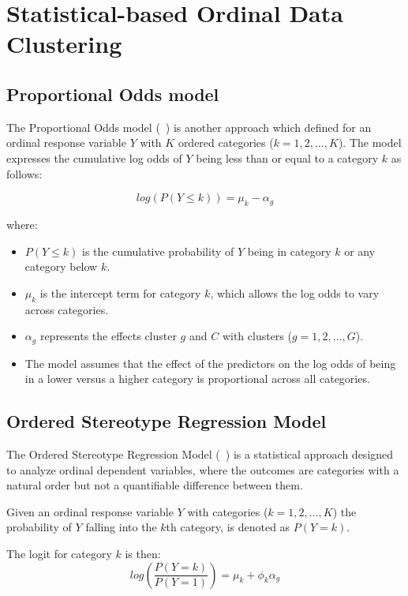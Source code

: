 \documentclass{article}
\begin{document}
\section{Statistical-based Ordinal Data Clustering}

\subsection{Proportional Odds model}

The Proportional Odds model (~\cite{mccullagh1980regression}) is another approach which defined for an ordinal response variable $Y$ with $K$ ordered categories ($k=1, 2, \ldots, K$). 
The model expresses the cumulative log odds of $Y$ being less than or equal to a category $k$ as follows:

\begin{equation}
log(P(Y \leq k )) = \mu_k - \alpha_g
\end{equation}

where:
\begin{itemize}
    \item $P(Y \leq k)$ is the cumulative probability of $Y$ being in category $k$ or any category below $k$.
    \item $\mu_k$ is the intercept term for category $k$, which allows the log odds to vary across categories.
    \item $\alpha_g$ represents the effects cluster $g$ and $C$ with clusters ({$g=1, 2, \ldots, G$}).
    \item The model assumes that the effect of the predictors on the log odds of being in a lower versus a higher category is proportional across all categories.
\end{itemize}

\subsection{Ordered Stereotype Regression Model}

The Ordered Stereotype Regression Model  (~\cite{anderson1984regression}) is a statistical approach designed to analyze ordinal dependent variables, where the outcomes are categories with a natural order but not a quantifiable difference between them.

Given an ordinal response variable $Y$ with categories ($k=1, 2, \ldots, K$) the probability of $Y$ falling into the $k$th category, is denoted as $P(Y = k)$.


The logit for category $k$ is then:
\begin{equation}
log\left(\frac{P(Y = k)}{P(Y = 1)}\right) = \mu_k + \phi_k \alpha_g
\end{equation}
\end{document}
